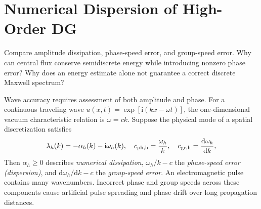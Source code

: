 \documentclass[11pt,openany]{book}
\numberwithin{equation}{chapter}
\theoremstyle{definition}
\theoremstyle{remark}
\newcommand{\dd}{\mathrm d}
\begin{document}
\section{Numerical Dispersion of High-Order DG}\label{sec:dg-dispersion}
\begin{checkpoint}
Compare amplitude dissipation, phase-speed error, and group-speed error.
Why can central flux conserve semidiscrete energy while introducing nonzero phase error?
Why does an energy estimate alone not guarantee a correct discrete Maxwell spectrum?
\end{checkpoint}
Wave accuracy requires assessment of both amplitude and phase.
For a continuous traveling wave $u(x,t)=\exp[\mathrm i(kx-\omega t)]$, the one-dimensional vacuum characteristic relation is $\omega=ck$.
Suppose the physical mode of a spatial discretization satisfies
\begin{equation}\label{eq:semidispersion}
\lambda_h(k)=-\alpha_h(k)-\mathrm i\omega_h(k),
\quad
c_{\rm ph,h}=\frac{\omega_h}{k},\quad
c_{\rm gr,h}=\frac{\dd\omega_h}{\dd k},
\end{equation}
Then $\alpha_h\geq0$ describes \emph{numerical dissipation},
$\omega_h/k-c$ the \emph{phase-speed error (dispersion)}, and
$\dd\omega_h/\dd k-c$ the \emph{group-speed error}.
An electromagnetic pulse contains many wavenumbers.
Incorrect phase and group speeds across these components cause artificial pulse spreading and phase drift over long propagation distances.
\end{document}
